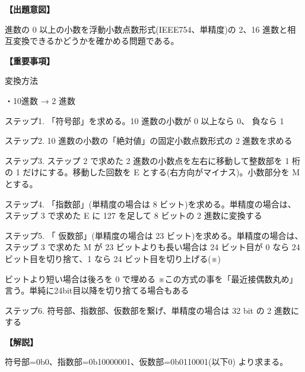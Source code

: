 \noindent \textbf{【出題意図】}

 進数の 0 以上の小数を浮動小数点数形式(IEEE754、単精度)の 2、16 進数と相互変換できるかどうかを確かめる問題である。

\vspace{1em}
\noindent \textbf{【重要事項】}

\noindent 変換方法

\medskip
\noindent ・10進数 → 2 進数

\medskip
\noindent ステップ1. 「符号部」を求める。10 進数の小数が 0 以上なら 0、 負なら 1 

\noindent ステップ2.  10 進数の小数の「絶対値」の固定小数点数形式の 2 進数を求める 

\noindent ステップ3.  ステップ 2 で求めた 2 進数の小数点を左右に移動して整数部を 1 桁の 1 だけにする。移動した回数を E とする(右方向がマイナス)。小数部分を M とする。

\noindent ステップ4.  「指数部」(単精度の場合は 8 ビット)を求める。単精度の場合は、ステップ 3 で求めた E に 127 を足して 8 ビットの 2 進数に変換する

\noindent ステップ5. 「 仮数部」(単精度の場合は 23 ビット)を求める。単精度の場合は、ステップ 3 で求めた M が 23 ビットよりも長い場合は 24 ビット目が 0 なら 24 ビット目を切り捨て、1 なら 24 ビット目を切り上げる(※)

 ビットより短い場合は後ろを 0 で埋める ※この方式の事を「最近接偶数丸め」言う。単純に24bit目以降を切り捨てる場合もある 

\noindent ステップ6.  符号部、指数部、仮数部を繋げ、単精度の場合は 32 bit の 2 進数にする


\vspace{1em}
\noindent \textbf{【解説】}

\noindent 符号部=0b0、指数部=0b10000001、仮数部=0b0110001(以下0) より求まる。
